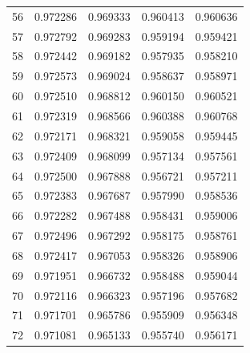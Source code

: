 \begin{table}
\begin{tabular}{rrrrr}
56 & 0.972286 & 0.969333 & 0.960413 & 0.960636 \\
57 & 0.972792 & 0.969283 & 0.959194 & 0.959421 \\
58 & 0.972442 & 0.969182 & 0.957935 & 0.958210 \\
59 & 0.972573 & 0.969024 & 0.958637 & 0.958971 \\
60 & 0.972510 & 0.968812 & 0.960150 & 0.960521 \\
61 & 0.972319 & 0.968566 & 0.960388 & 0.960768 \\
62 & 0.972171 & 0.968321 & 0.959058 & 0.959445 \\
63 & 0.972409 & 0.968099 & 0.957134 & 0.957561 \\
64 & 0.972500 & 0.967888 & 0.956721 & 0.957211 \\
65 & 0.972383 & 0.967687 & 0.957990 & 0.958536 \\
66 & 0.972282 & 0.967488 & 0.958431 & 0.959006 \\
67 & 0.972496 & 0.967292 & 0.958175 & 0.958761 \\
68 & 0.972417 & 0.967053 & 0.958326 & 0.958906 \\
69 & 0.971951 & 0.966732 & 0.958488 & 0.959044 \\
70 & 0.972116 & 0.966323 & 0.957196 & 0.957682 \\
71 & 0.971701 & 0.965786 & 0.955909 & 0.956348 \\
72 & 0.971081 & 0.965133 & 0.955740 & 0.956171 \\
\bottomrule
\end{tabular}
\end{table}
